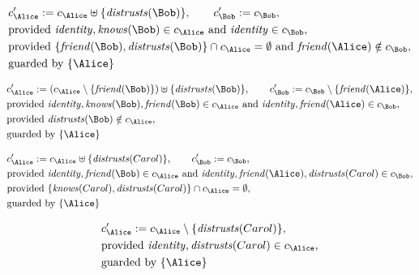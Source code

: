 \begin{align*}
&
c'_
{
\Alice
}
 := 
c_
{
\Alice
}
 \uplus 
\{
\mathit{
distrusts
}
(
\Bob
)
\}
, \qquad 
c'_
{
\Bob
}
 := 
c_
{
\Bob
}
,\\
&
\text{provided } 
\mathit{
identity
}
,
\mathit{
knows
}
(
\Bob
)
 \in c_
{
\Alice
}
 \text{ and } 
\mathit{
identity
}
 \in c_
{
\Bob
}
,\\
&
\text{provided } 
\{
\mathit{
friend
}
(
\Bob
)
,
\mathit{
distrusts
}
(
\Bob
)
\}
 \cap c_
{
\Alice
}
 = \emptyset
 \text{ and } 
\mathit{
friend
}
(
\Alice
)
 \notin c_
{
\Bob
}
,\\
&
\text{guarded by } \{
\Alice
\}
\end{align*}

\begin{align*}
&
c'_
{
\Alice
}
 := 
(c_
{
\Alice
}
 \setminus 
\{
\mathit{
friend
}
(
\Bob
)
\}
) \uplus 
\{
\mathit{
distrusts
}
(
\Bob
)
\}
, \qquad 
c'_
{
\Bob
}
 := 
c_
{
\Bob
}
 \setminus 
\{
\mathit{
friend
}
(
\Alice
)
\}
,\\
&
\text{provided } 
\mathit{
identity
}
,
\mathit{
knows
}
(
\Bob
)
,
\mathit{
friend
}
(
\Bob
)
 \in c_
{
\Alice
}
 \text{ and } 
\mathit{
identity
}
,
\mathit{
friend
}
(
\Alice
)
 \in c_
{
\Bob
}
,\\
&
\text{provided } 
\mathit{
distrusts
}
(
\Bob
)
 \notin c_
{
\Alice
}
,\\
&
\text{guarded by } \{
\Alice
\}
\end{align*}

\begin{align*}
&
c'_
{
\Alice
}
 := 
c_
{
\Alice
}
 \uplus 
\{
\mathit{
distrusts
}
(
Carol
)
\}
, \qquad 
c'_
{
\Bob
}
 := 
c_
{
\Bob
}
,\\
&
\text{provided } 
\mathit{
identity
}
,
\mathit{
friend
}
(
\Bob
)
 \in c_
{
\Alice
}
 \text{ and } 
\mathit{
identity
}
,
\mathit{
friend
}
(
\Alice
)
,
\mathit{
distrusts
}
(
Carol
)
 \in c_
{
\Bob
}
,\\
&
\text{provided } 
\{
\mathit{
knows
}
(
Carol
)
,
\mathit{
distrusts
}
(
Carol
)
\}
 \cap c_
{
\Alice
}
 = \emptyset
,\\
&
\text{guarded by } \{
\Alice
\}
\end{align*}

\begin{align*}
&
c'_
{
\Alice
}
 := 
c_
{
\Alice
}
 \setminus 
\{
\mathit{
distrusts
}
(
Carol
)
\}
,\\
&
\text{provided } 
\mathit{
identity
}
,
\mathit{
distrusts
}
(
Carol
)
 \in c_
{
\Alice
}
,\\
&
\text{guarded by } \{
\Alice
\}
\end{align*}
